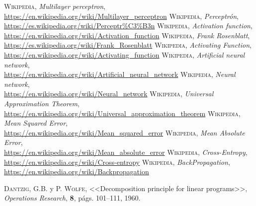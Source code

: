 \documentclass[a4paper, 11pt]{article}
\begin{document}
\begin{thebibliography}{X}
 \textsc{Wikipedia},
\textit{Multilayer perceptron},\\ \url{https://en.wikipedia.org/wiki/Multilayer_perceptron}
 \textsc{Wikipedia},
\textit{Perceptrón},\\ \url{https://es.wikipedia.org/wiki/Perceptr%C3%B3n}
 \textsc{Wikipedia},
\textit{Activation function},\\ \url{https://en.wikipedia.org/wiki/Activation_function}
 \textsc{Wikipedia},
\textit{Frank Rosenblatt},\\ \url{https://es.wikipedia.org/wiki/Frank_Rosenblatt}
 \textsc{Wikipedia},
\textit{Activating Function},\\ \url{https://en.wikipedia.org/wiki/Activating_function}
 \textsc{Wikipedia},
\textit{Artificial neural network},\\ \url{https://en.wikipedia.org/wiki/Artificial_neural_network}
 \textsc{Wikipedia},
\textit{Neural network},\\ \url{https://en.wikipedia.org/wiki/Neural_network}
 \textsc{Wikipedia},
\textit{Universal Approximation Theorem},\\ \url{https://en.wikipedia.org/wiki/Universal_approximation_theorem}
 \textsc{Wikipedia},
\textit{Mean Squared Error},\\ \url{https://en.wikipedia.org/wiki/Mean_squared_error}
 \textsc{Wikipedia},
\textit{Mean Absolute Error},\\ \url{https://en.wikipedia.org/wiki/Mean_absolute_error}
 \textsc{Wikipedia},
\textit{Cross-Entropy},\\ \url{https://en.wikipedia.org/wiki/Cross-entropy}
 \textsc{Wikipedia},
\textit{BackPropagation},\\ \url{https://en.wikipedia.org/wiki/Backpropagation}

 \textsc{Dantzig, G.B.} y \textsc{P. Wolfe},
<<Decomposition principle for linear programs>>,
\textit{Operations Research}, \textbf{8}, págs. 101--111, 1960.

\end{thebibliography}
\end{document}
